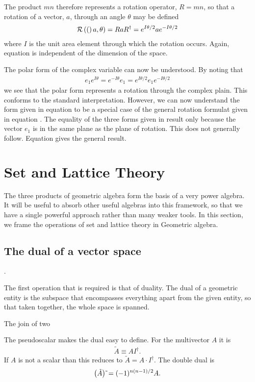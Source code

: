 The product $mn$ therefore represents a rotation operator,
$R = mn$,
so that a rotation of a vector, $a$, through an angle $\theta$ may be defined
\begin{align}
  {\cal R}\left( ( \right)a, \theta) = RaR^\dagger = e^{I \theta/2}ae^{-I \theta/2}
  \label{eqn:rotation}
\end{align}
where $I$ is the unit area element through which the rotation occurs.
Again, equation  is independent of the dimension of the space.

The polar form of the complex variable can now be understood.
By noting that 
\begin{align}
  e_1  e^{I\theta} =  e^{-I\theta}e_1 =  e^{I\theta/2}e_1  e^{-I\theta/2}
  \label{eqn:complex_triplet}
\end{align}
we see that the polar form represents a rotation through the complex plain.
This conforms to the standard interpretation.
However,
we can now understand the form given in equation  
to be a special case of the general rotation formulat given in equation .
The equality of the three forms given in  result 
only because the vector $e_1$ is in the same plane as the plane of rotation.
This does not generally follow.
Equation  gives the general result.

\section{Set and Lattice Theory}

The three products of geometric algebra form the basis of a very power algebra.
It will be useful to absorb other useful algebras into this framework,
so that we have a single powerful approach rather than many weaker tools.
In this section, we frame the operations of set and lattice theory in Geometric algebra.

\subsection{The dual of a vector space}.

The first operation that is required is that of duality.
The dual of a geometric entity is the subspace that encompasses everything apart from the given entity,
so that taken together, the whole space is spanned.

The join of two


The pseudoscalar makes the dual easy to define.
For the multivector $A$ it is 
\begin{align}
  \tilde{A} \equiv A I^\dagger.
\end{align}
If $A$ is not a scalar than this reduces to $ \tilde{A} = A \cdot I^\dagger$.
The double dual is 
\begin{align}
  \left( \tilde{A} \right)\tilde{} = (-1)^{n(n-1)/2} A.
\end{align}

